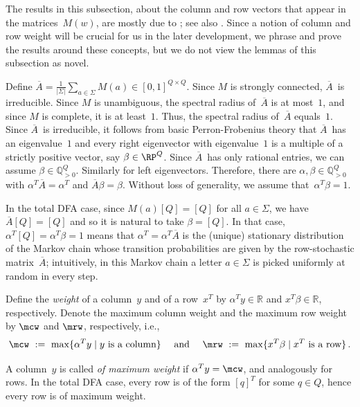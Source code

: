 The results in this subsection, about the column and row vectors that appear in the matrices~$M(w)$, are mostly due to \cite{Cesari74}; see also \cite[Section 3]{BealCKP08}.
Since a notion of column and row weight will be crucial for us in the later development, we phrase and prove the results around these concepts, but we do not view the lemmas of this subsection as novel.

Define $\overline{A} = \frac{1}{|\Sigma|} \sum_{a\in \Sigma} M(a) \in [0,1]^{Q \times Q}$.
Since $M$ is strongly connected, $\overline{A}$~is irreducible.
Since $M$ is unambiguous, the spectral radius of~$\overline{A}$ is at most~$1$, and since $M$ is complete, it is at least~$1$.
Thus, the spectral radius of~$\overline{A}$ equals~$1$.
Since $\overline{A}$~is irreducible, it follows from basic Perron-Frobenius theory that $\overline{A}$~has an eigenvalue~$1$ and every right eigenvector with eigenvalue~$1$ is a multiple of a strictly positive vector, say $\beta \in \RP^Q$.
Since $\overline{A}$~has only rational entries, we can assume $\beta \in \mathbb{Q}_{>0}^Q$.
Similarly for left eigenvectors.
Therefore, there are $\alpha, \beta \in \mathbb{Q}_{>0}^Q$ with $\alpha^T \overline{A} = \alpha^T$ and $\overline{A} \beta = \beta$.
Without loss of generality, we assume that~$\alpha^T \beta = 1$.

In the total DFA case, since $M(a) [Q] = [Q]$ for all $a \in \Sigma$, we have $\overline{A} [Q] = [Q]$ and so it is natural to take $\beta = [Q]$.
In that case, $\alpha^T [Q] = \alpha^T \beta = 1$ means that $\alpha^T = \alpha^T \overline{A}$ is the (unique) stationary distribution of the Markov chain whose transition probabilities are given by the row-stochastic matrix~$\overline{A}$; intuitively, in this Markov chain a letter $a \in \Sigma$ is picked uniformly at random in every step.


Define the \emph{weight} of a column~$y$ and of a row~$x^T$ by $\alpha^T y \in \mathbb{R}$ and $x^T \beta \in \mathbb{R}$, respectively.
Denote the maximum column weight and the maximum row weight by $\mcw$ and $\mrw$, respectively, i.e.,
\[
 \mcw \ := \ \max\{\alpha^T y \mid y \text{ is a column}\} \quad \text{ and } \quad
 \mrw \ := \ \max\{x^T \beta   \mid x^T \text{ is a row}\}\,.
\]

\noindent
A column~$y$ is called \emph{of maximum weight} if $\alpha^T y = \mcw$, and analogously for rows.
In the total DFA case, every row is of the form $[q]^T$ for some $q \in Q$, hence every row is of maximum weight.


